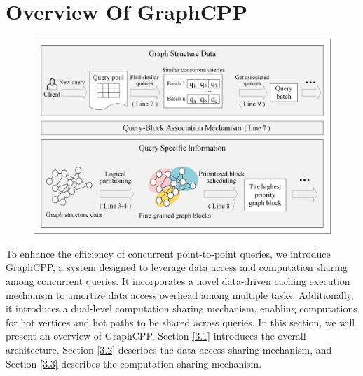 \documentclass[10pt,journal,compsoc]{IEEEtran}
\begin{document}
\vspace{-6pt}
\section{Overview Of GraphCPP}\label{overview}
\begin{figure}[t]
    \centering
    \includegraphics[width=\columnwidth]{picture/Zhang-fig5.png}
    \captionsetup{labelsep=period}
    \caption{}
    \label{fig5}
    \vspace{-0.5cm}
\end{figure}
To enhance the efficiency of concurrent point-to-point queries, we introduce GraphCPP, a system designed to leverage data access and computation sharing among concurrent queries. It incorporates a novel data-driven caching execution mechanism to amortize data access overhead among multiple tasks. Additionally, it introduces a dual-level computation sharing mechanism, enabling computations for hot vertices and hot paths to be shared across queries.
In this section, we will present an overview of GraphCPP. Section \ref{3.1} introduces the overall architecture. Section \ref{3.2} describes the data access sharing mechanism, and Section \ref{3.3} describes the computation sharing mechanism.
\end{document}
